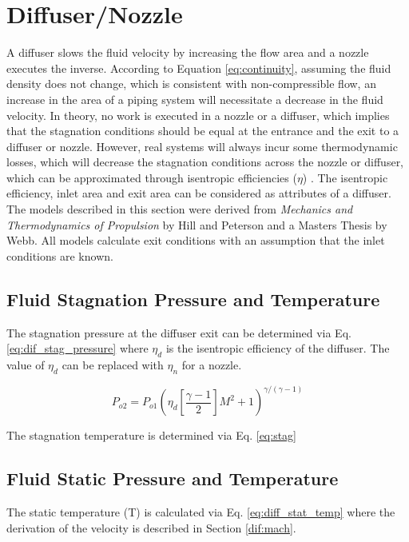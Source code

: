 \section{Diffuser/Nozzle}
A diffuser slows the fluid velocity by increasing the flow area and a nozzle executes the inverse.  According to Equation \ref{eq:continuity}, 
assuming the fluid density does not change, which is consistent with non-compressible flow, an increase in the 
area of a piping system will necessitate a decrease in the fluid velocity.   In theory, no work is executed in a nozzle
or a diffuser, which implies that the stagnation conditions should be equal at the entrance and the exit
to a diffuser or nozzle.  However, real systems will always incur some thermodynamic losses, which will
decrease the stagnation conditions across the nozzle or diffuser, which can be approximated through
isentropic efficiencies ($\eta$) .  The isentropic efficiency, inlet area and exit area can be considered as attributes of a diffuser.
The models described in this section were derived from 
\textit{Mechanics and Thermodynamics of Propulsion} by Hill and Peterson\cite{Hill} and a 
Masters Thesis by Webb\cite{Webb}.  All models calculate exit conditions with an assumption that the inlet conditions are known.

\subsection{Fluid Stagnation Pressure and Temperature}
The stagnation pressure at the diffuser exit can be determined via Eq. \ref{eq:dif_stag_pressure} 
where $\eta_d$ is the isentropic efficiency of the diffuser.  The value of $\eta_d$ can be replaced
with $\eta_n$ for a nozzle.

\begin{equation}
\label{eq:dif_stag_pressure}
P_{o2}=P_{o1}\left(\eta_d\left[\frac{\gamma-1}{2}\right]M^2+1\right)^{\gamma/\left(\gamma-1\right)}
\end{equation}

\noindent The stagnation temperature is determined via Eq. \ref{eq:stag}

\subsection{Fluid Static Pressure and Temperature}
The static temperature (T) is calculated via Eq. \ref{eq:diff_stat_temp} where the derivation of the velocity is described
in Section \ref{dif:mach}.

